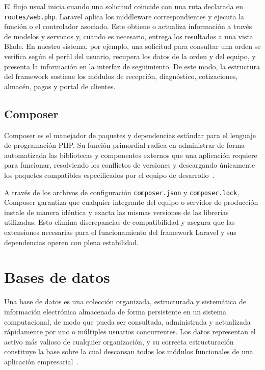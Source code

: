 El flujo usual inicia cuando una solicitud coincide con una ruta declarada en \texttt{routes/web.php}. Laravel aplica los middleware correspondientes y ejecuta la función o el controlador asociado. Este obtiene o actualiza información a través de modelos y servicios y, cuando es necesario, entrega los resultados a una vista Blade. En nuestro sistema, por ejemplo, una solicitud para consultar una orden se verifica según el perfil del usuario, recupera los datos de la orden y del equipo, y presenta la información en la interfaz de seguimiento. De este modo, la estructura del framework sostiene los módulos de recepción, diagnóstico, cotizaciones, almacén, pagos y portal de clientes.

\subsection{Composer}

Composer es el manejador de paquetes y dependencias estándar para el lenguaje de programación PHP. Su función primordial radica en administrar de forma automatizada las bibliotecas y componentes externos que una aplicación requiere para funcionar, resolviendo los conflictos de versiones y descargando únicamente los paquetes compatibles especificados por el equipo de desarrollo~\cite{composer_doc}.

A través de los archivos de configuración \texttt{composer.json} y \texttt{composer.lock}, Composer garantiza que cualquier integrante del equipo o servidor de producción instale de manera idéntica y exacta las mismas versiones de las librerías utilizadas. Esto elimina discrepancias de compatibilidad y asegura que las extensiones necesarias para el funcionamiento del framework Laravel y sus dependencias operen con plena estabilidad.

\section{Bases de datos}

Una base de datos es una colección organizada, estructurada y sistemática de información electrónica almacenada de forma persistente en un sistema computacional, de modo que pueda ser consultada, administrada y actualizada rápidamente por uno o múltiples usuarios concurrentes. Los datos representan el activo más valioso de cualquier organización, y su correcta estructuración constituye la base sobre la cual descansan todos los módulos funcionales de una aplicación empresarial~\cite{elmasri2016fundamentals}.

